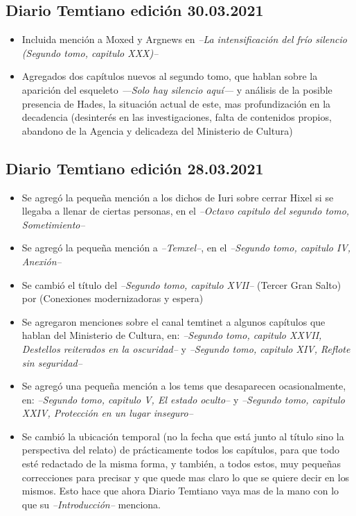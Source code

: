 \documentclass[
]{book}
\begin{document}
\hypertarget{diario-temtiano-ediciuxf3n-30.03.2021}{%
\subsection*{Diario Temtiano edición 30.03.2021}\label{diario-temtiano-ediciuxf3n-30.03.2021}}

\begin{itemize}
\item[$\boxtimes$]
  Incluida mención a Moxed y Argnews en \emph{--La intensificación del frío silencio (Segundo tomo, capitulo XXX)--}
\item[$\boxtimes$]
  Agregados dos capítulos nuevos al segundo tomo, que hablan sobre la aparición del esqueleto \emph{---Solo hay silencio aquí---} y análisis de la posible presencia de Hades, la situación actual de este, mas profundización en la decadencia (desinterés en las investigaciones, falta de contenidos propios, abandono de la Agencia y delicadeza del Ministerio de Cultura)
\end{itemize}

\hypertarget{diario-temtiano-ediciuxf3n-28.03.2021}{%
\subsection*{Diario Temtiano edición 28.03.2021}\label{diario-temtiano-ediciuxf3n-28.03.2021}}

\begin{itemize}
\item[$\boxtimes$]
  Se agregó la pequeña mención a los dichos de Iuri sobre cerrar Hixel si se llegaba a llenar de ciertas personas, en el \emph{--Octavo capitulo del segundo tomo, Sometimiento--}
\item[$\boxtimes$]
  Se agregó la pequeña mención a \emph{--Temxel--}, en el \emph{--Segundo tomo, capitulo IV, Anexión--}
\item[$\boxtimes$]
  Se cambió el título del \emph{--Segundo tomo, capitulo XVII--} (Tercer Gran Salto) por (Conexiones modernizadoras y espera)
\item[$\boxtimes$]
  Se agregaron menciones sobre el canal temtinet a algunos capítulos que hablan del Ministerio de Cultura, en: \emph{--Segundo tomo, capitulo XXVII, Destellos reiterados en la oscuridad--} y \emph{--Segundo tomo, capitulo XIV, Reflote sin seguridad--}
\item[$\boxtimes$]
  Se agregó una pequeña mención a los tems que desaparecen ocasionalmente, en: \emph{--Segundo tomo, capitulo V, El estado oculto--} y \emph{--Segundo tomo, capitulo XXIV, Protección en un lugar inseguro--}
\item[$\boxtimes$]
  Se cambió la ubicación temporal (no la fecha que está junto al título sino la perspectiva del relato) de prácticamente todos los capítulos, para que todo esté redactado de la misma forma, y también, a todos estos, muy pequeñas correcciones para precisar y que quede mas claro lo que se quiere decir en los mismos. Esto hace que ahora Diario Temtiano vaya mas de la mano con lo que su \emph{--Introducción--} menciona.
\end{itemize}
\end{document}
